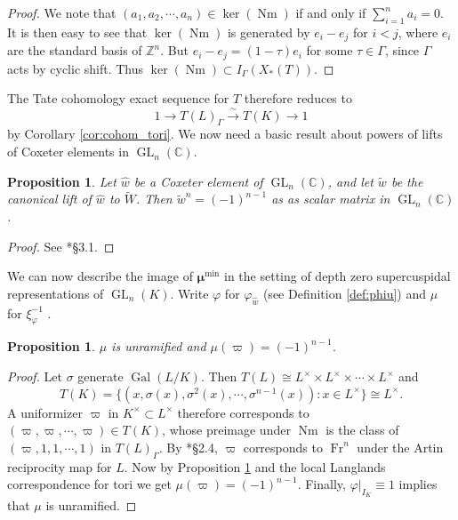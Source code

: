\documentclass{amsart}
\theoremstyle{plain}
\newtheorem{proposition}[theorem]{Proposition}
\theoremstyle{definition}
\numberwithin{equation}{section}
\DeclareMathOperator{\Gal}{Gal}
\DeclareMathOperator{\Nm}{Nm}
\DeclareMathOperator{\Fr}{Fr}
\DeclareMathOperator{\GL}{GL}
\newcommand{\CC}{\mathbb{C}}
\newcommand{\Kx}{K^\times}
\newcommand{\Lx}{L^\times}
\newcommand{\bmu}{\boldsymbol\mu}
\newcommand{\mumin}{\bmu^{\min}}
\begin{document}
\begin{proof}
We note that $(a_1, a_2, \cdots, a_n) \in \ker(\Nm)$ if and only if $\sum_{i=1}^n a_i = 0$.
It is then easy to see that $\ker(\Nm)$ is generated by $e_i - e_j$ for $i < j$, where
$e_i$ are the standard basis of $\mathbb{Z}^n$.  But $e_i - e_j = (1 - \tau)e_i$ for some
$\tau \in \Gamma$, since $\Gamma$ acts by cyclic shift.  Thus $\ker(\Nm) \subset I_{\Gamma}(X_*(T))$.
\end{proof}

The Tate cohomology exact sequence for $T$ therefore reduces to
$$1 \rightarrow T(L)_{\Gamma} \xrightarrow{\sim} T(K) \rightarrow 1$$ by
Corollary \ref{cor:cohom_tori}.  We now need a basic result about powers of lifts
of Coxeter elements in $\GL_{n}(\CC)$.

\begin{proposition}\label{prop:powers_of_lifts}
Let $\hat{w}$ be a Coxeter element of $\GL_{n}(\CC)$, and let $\tilde{w}$ be the
canonical lift of $\hat{w}$ to $\widetilde{W}$. Then $\tilde{w}^n = (-1)^{n-1}$ as
as scalar matrix in $\GL_{n}(\CC)$.
\end{proposition}

\begin{proof}
See \cite{zaremsky:ppa}*{\S3.1}.
\end{proof}

We can now describe the image of $\mumin$ in the setting of
depth zero supercuspidal representations of $\GL_{n}(K)$.  Write
$\varphi$ for $\varphi_{\hat{w}}$ (see Definition \ref{def:phiu}) and $\mu$ for $\xi_{\varphi}^{-1}$ .

\begin{proposition} \label{prop:rectifier_agreement}
$\mu$ is unramified and
$\mu(\varpi) = (-1)^{n-1}$.
\end{proposition}

\begin{proof}
Let $\sigma$ generate $\Gal(L/K)$.  Then $T(L) \cong \Lx \times \Lx \times \cdots \times \Lx$ and
$$T(K) = \{(x, \sigma(x), \sigma^2(x), \cdots, \sigma^{n-1}(x)) : x \in \Lx \} \cong \Lx.$$
A uniformizer $\varpi$ in $\Kx \subset \Lx$
therefore corresponds to $(\varpi, \varpi, \cdots, \varpi) \in T(K)$, whose
preimage under $\Nm$ is the class of $(\varpi, 1, 1, \cdots, 1)$ in $T(L)_{\Gamma}$.
By \cite{serre:LocalClassFieldThy}*{\S 2.4}, $\varpi$ corresponds to $\Fr^n$ under the Artin
reciprocity map for $L$.  Now by Proposition \ref{prop:powers_of_lifts}
and the local Langlands correspondence for tori we get
$\mu(\varpi) = (-1)^{n-1}$.
Finally, $\varphi|_{I_K} \equiv 1$ implies that $\mu$ is
unramified.
\end{proof}
\end{document}
